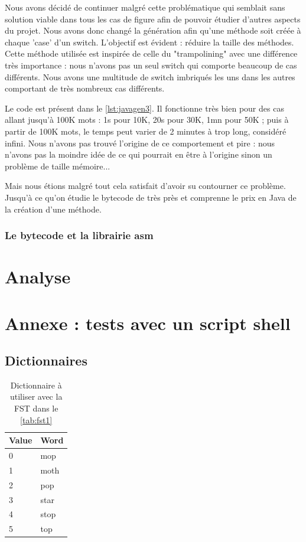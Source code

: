 Nous avons décidé de continuer malgré cette problématique qui semblait sans solution viable
dans tous les cas de figure afin de pouvoir étudier d'autres aspects du projet. Nous avons
donc changé la génération afin qu'une méthode soit créée à chaque 'case' d'un switch.
L'objectif est évident : réduire la taille des méthodes. Cette méthode utilisée est inspirée
de celle du "trampolining" avec une différence très importance : nous n'avons pas un seul
switch qui comporte beaucoup de cas différents. Nous avons une multitude de switch imbriqués
les uns dans les autres comportant de très nombreux cas différents.


Le code est présent dans le \autoref{lst:javagen3}. Il fonctionne très bien pour des cas
allant jusqu'à 100K mots : 1s pour 10K, 20s pour 30K, 1mn pour 50K ;
puis à partir de 100K mots, le temps peut varier de 2 minutes
à trop long, considéré infini. Nous n'avons pas trouvé l'origine de ce
comportement et pire : nous n'avons pas la moindre idée de ce qui pourrait en être à
l'origine sinon un problème de taille mémoire...


Mais nous étions malgré tout cela satisfait d'avoir su contourner ce problème. Jusqu'à ce
qu'on étudie le bytecode de très près et comprenne le prix en Java de la création d'une
méthode.

\subsubsection{Le bytecode et la librairie asm}

\newpage
\section{Analyse}

\newpage
\appendix
\section{Annexe : tests avec un script shell}
\label{sec:annexe:shell}

\subsection{Dictionnaires}

\begin{table}[h]
    \centering
    \begin{tabular}{|l|l|}
        \hline
        Value & Word \\
        \hline
        0 & mop \\
        1 & moth \\
        2 & pop \\
        3 & star \\
        4 & stop \\
        5 & top \\
        \hline
    \end{tabular}
    \caption{Dictionnaire à utiliser avec la FST dans le \autoref{tab:fst1}}
    \label{tab:dico1}
\end{table}

